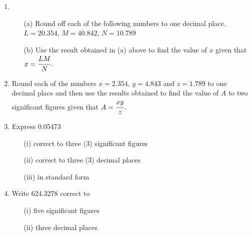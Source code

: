 \begin{enumerate}
	 \item 
	 	\begin{itemize}
	 	\item[(a)] Round off each of the following numbers to one decimal place. $L = 20.354$, $M = 40.842$, $N = 10.789$
	 	\item[(b)] Use the result obtained in (a) above to find the value of $x$ given that $x = \cfrac{LM}{N}$.
	 	\end{itemize}
	 	
	\item Round each of the numbers $x = 2.354$, $y = 4.843$ and $z = 1.789$ to one decimal place and then use the results obtained to find the value of $A$ to two significant figures given that $A = \cfrac{xy}{z}$.
	 
	\item Express 0.05473
		\begin{itemize}
		\item[(i)] correct to three (3) significant figures
		\item[(ii)] correct to three (3) decimal places
		\item[(iii)] in standard form
		\end{itemize}
	
	\item Write 624.3278 correct to
		\begin{itemize}
		\item[(i)] five significant figures
		\item[(ii)] three decimal places
		\end{itemize}



\end{enumerate}	
